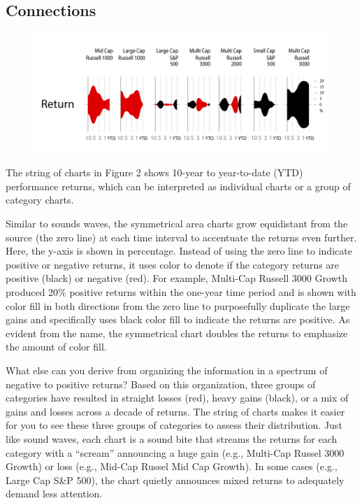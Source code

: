 \documentclass[]{book}
\theoremstyle{definition}
\theoremstyle{definition}
\theoremstyle{definition}
\theoremstyle{remark}
\begin{document}
\subsection{Connections}\label{connections}

\begin{figure}
\centering
\includegraphics{images/pattern-2.jpg}
\caption{}
\end{figure}

The string of charts in Figure 2 shows 10-year to year-to-date (YTD)
performance returns, which can be interpreted as individual charts or a
group of category charts.

Similar to sounds waves, the symmetrical area charts grow equidistant
from the source (the zero line) at each time interval to accentuate the
returns even further. Here, the y-axis is shown in percentage. Instead
of using the zero line to indicate positive or negative returns, it uses
color to denote if the category returns are positive (black) or negative
(red). For example, Multi-Cap Russell 3000 Growth produced 20\% positive
returns within the one-year time period and is shown with color fill in
both directions from the zero line to purposefully duplicate the large
gains and specifically uses black color fill to indicate the returns are
positive. As evident from the name, the symmetrical chart doubles the
returns to emphasize the amount of color fill.

What else can you derive from organizing the information in a spectrum
of negative to positive returns? Based on this organization, three
groups of categories have resulted in straight losses (red), heavy gains
(black), or a mix of gains and losses across a decade of returns. The
string of charts makes it easier for you to see these three groups of
categories to assess their distribution. Just like sound waves, each
chart is a sound bite that streams the returns for each category with a
``scream'' announcing a huge gain (e.g., Multi-Cap Russel 3000 Growth)
or loss (e.g., Mid-Cap Russel Mid Cap Growth). In some cases (e.g.,
Large Cap S\&P 500), the chart quietly announces mixed returns to
adequately demand less attention.
\end{document}

